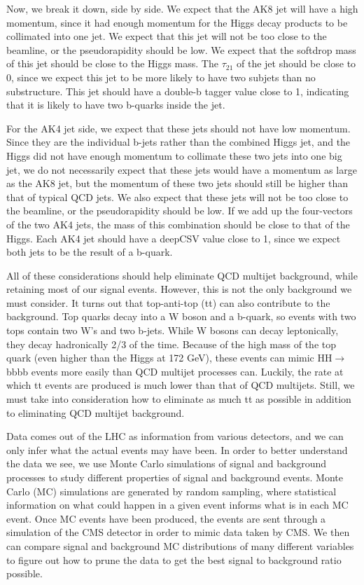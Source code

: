 Now, we break it down, side by side. We expect that the AK8 jet will have a high momentum, since it had enough momentum for the Higgs decay products to be collimated into one jet. We expect that this jet will not be too close to the beamline, or the pseudorapidity should be low. We expect that the softdrop mass of this jet should be close to the Higgs mass. The $\tau_{21}$ of the jet should be close to 0, since we expect this jet to be more likely to have two subjets than no substructure. This jet should have a double-b tagger value close to 1, indicating that it is likely to have two b-quarks inside the jet.

For the AK4 jet side, we expect that these jets should not have low momentum. Since they are the individual b-jets rather than the combined Higgs jet, and the Higgs did not have enough momentum to collimate these two jets into one big jet, we do not necessarily expect that these jets would have a momentum as large as the AK8 jet, but the momentum of these two jets should still be higher than that of typical QCD jets. We also expect that these jets will not be too close to the beamline, or the pseudorapidity should be low. If we add up the four-vectors of the two AK4 jets, the mass of this combination should be close to that of the Higgs. Each AK4 jet should have a deepCSV value close to 1, since we expect both jets to be the result of a b-quark.

All of these considerations should help eliminate QCD multijet background, while retaining most of our signal events. However, this is not the only background we must consider. It turns out that top-anti-top (tt) can also contribute to the background. Top quarks decay into a W boson and a b-quark, so events with two tops contain two W's and two b-jets. While W bosons can decay leptonically, they decay hadronically 2/3 of the time. Because of the high mass of the top quark (even higher than the Higgs at 172 GeV), these events can mimic HH$\rightarrow$bbbb events more easily than QCD multijet processes can. Luckily, the rate at which tt events are produced is much lower than that of QCD multijets. Still, we must take into consideration how to eliminate as much tt as possible in addition to eliminating QCD multijet background. 

Data comes out of the LHC as information from various detectors, and we can only infer what the actual events may have been. In order to better understand the data we see, we use Monte Carlo simulations of signal and background processes to study different properties of signal and background events. Monte Carlo (MC) simulations are generated by random sampling, where statistical information on what could happen in a given event informs what is in each MC event. Once MC events have been produced, the events are sent through a simulation of the CMS detector in order to mimic data taken by CMS. We then can compare signal and background MC distributions of many different variables to figure out how to prune the data to get the best signal to background ratio possible.

